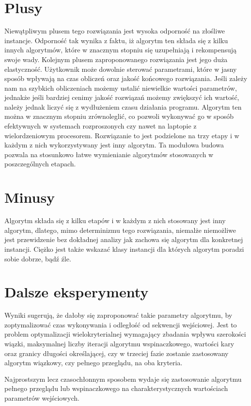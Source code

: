 \documentclass{article}
\begin{document}
\section{Plusy}
Niewątpliwym plusem tego rozwiązania jest wysoka odporność na złośliwe instancje. Odporność tak wynika z faktu, iż algorytm ten składa się z kilku innych algorytmów, które w znacznym stopniu się uzupełniają i rekompensują swoje wady.
Kolejnym plusem zaproponowanego rozwiązania jest jego duża elastyczność. Użytkownik może dowolnie sterować parametrami, które w jasny sposób wpływają na czas obliczeń oraz jakość końcowego rozwiązania. Jeśli zależy nam na szybkich obliczeniach możemy ustalić niewielkie wartości parametrów, jednakże jeśli bardziej cenimy jakość rozwiązań możemy zwiększyć ich wartość, należy jednak liczyć się z wydłużeniem czasu działania programu.
Algorytm ten można w znacznym stopniu zrównoleglić, co pozwoli wykonywać go w sposób efektywnych w systemach rozproszonych czy nawet na laptopie z wielordzeniowym procesorem.
Rozwiązanie to jest podzielone na trzy etapy i w każdym z nich wykorzystywany jest inny algorytm. Ta modułowa budowa pozwala na stosunkowo łatwe wymienianie algorytmów stosowanych w poszczególnych etapach.

\section{Minusy}
Algorytm składa się z kilku etapów i w każdym z nich stosowany jest inny algorytm, dlatego, mimo determinizmu tego rozwiązania, niemalże niemożliwe jest przewidzenie bez dokładnej analizy jak zachowa się algorytm dla konkretnej instancji. Ciężko jest także wskazać klasy instancji dla których algorytm poradzi sobie dobrze, bądź źle.


\section{Dalsze eksperymenty}

Wyniki sugerują, że dałoby się zaproponować takie parametry algorytmu, by zoptymalizować czas wykonywania i odległość od sekwencji wejściowej.
Jest to problem optymalizacji wielokryterialnej wymagający zbadania wpływu szerokości wiązki, maksymalnej liczby iteracji algorytmu wspinaczkowego, wartości kary oraz granicy długości określającej, czy w trzeciej fazie zostanie zastosowany algorytm wiązkowy, czy pełnego przeglądu, na oba kryteria.

Najprostszym lecz czasochłonnym sposobem wydaje się zastosowanie algorytmu pełnego przeglądu lub wspinaczkowego na charakterystycznych wartościach parametrów wejściowych.
\end{document}
